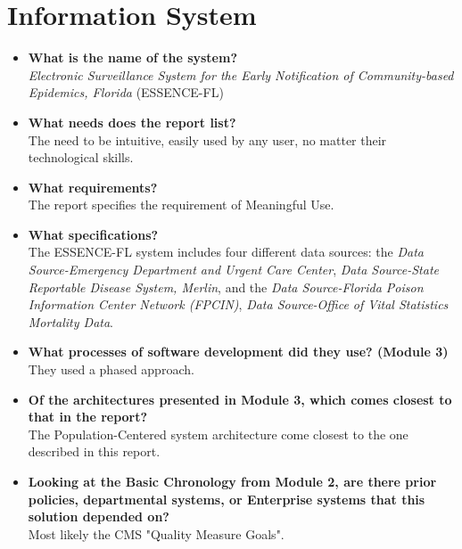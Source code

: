 \documentclass{article}
\begin{document}
\section{Information System}
\begin{itemize}

\item{\textbf{What is the name of the system?}}\\
\textit{Electronic Surveillance System for the Early Notification of Community-based Epidemics, Florida} (ESSENCE-FL)

\item{\textbf{What needs does the report list?}}\\
The need to be intuitive, easily used by any user, no matter their technological skills.

\item{\textbf{What requirements?}}\\
The report specifies the requirement of Meaningful Use.

\item{\textbf{What specifications?}}\\
The ESSENCE-FL system includes four different data sources: the \textit{Data Source-Emergency Department and Urgent Care Center}, \textit{Data Source-State Reportable Disease System, Merlin}, and the \textit{Data Source-Florida Poison Information Center Network (FPCIN)}, \textit{Data Source-Office of Vital Statistics Mortality Data}.

\item{\textbf{What processes of software development did they use? (Module 3)}}\\
They used a phased approach.

\item{\textbf{Of the architectures presented in Module 3, which comes closest to that in the report?}}\\
The Population-Centered system architecture come closest to the one described in this report.

\item{\textbf{Looking at the Basic Chronology from Module 2, are there prior policies, departmental systems, or Enterprise systems that this solution depended on?}}\\
Most likely the CMS "Quality Measure Goals".

\end{itemize}
\end{document}
